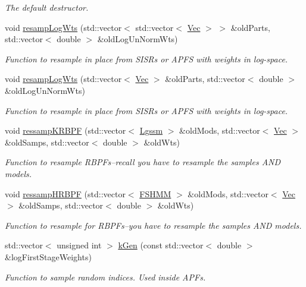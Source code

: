 \begin{DoxyCompactItemize}
\begin{DoxyCompactList}\small\item\em The default destructor. \end{DoxyCompactList}\item 
void \hyperlink{classMultinomResamp_a0ea6269180faf0b0613072d9bc8a7b53}{resamp\+Log\+Wts} (std\+::vector$<$ std\+::vector$<$ \hyperlink{apf__filter_8h_a4c7df05c6f5e8a0d15ae14bcdbc07152}{Vec} $>$ $>$ \&old\+Parts, std\+::vector$<$ double $>$ \&old\+Log\+Un\+Norm\+Wts)
\begin{DoxyCompactList}\small\item\em Function to resample in place from S\+I\+S\+Rs or A\+P\+FS with weights in log-\/space. \end{DoxyCompactList}\item 
void \hyperlink{classMultinomResamp_afd01aa78b0e2c0112c6af41164bc1e2b}{resamp\+Log\+Wts} (std\+::vector$<$ \hyperlink{apf__filter_8h_a4c7df05c6f5e8a0d15ae14bcdbc07152}{Vec} $>$ \&old\+Parts, std\+::vector$<$ double $>$ \&old\+Log\+Un\+Norm\+Wts)
\begin{DoxyCompactList}\small\item\em Function to resample in place from S\+I\+S\+Rs or A\+P\+FS with weights in log-\/space. \end{DoxyCompactList}\item 
void \hyperlink{classMultinomResamp_ad39c4f5d5460e3e4a2c56370c8dab39f}{ressamp\+K\+R\+B\+PF} (std\+::vector$<$ \hyperlink{classLgssm}{Lgssm} $>$ \&old\+Mods, std\+::vector$<$ \hyperlink{apf__filter_8h_a4c7df05c6f5e8a0d15ae14bcdbc07152}{Vec} $>$ \&old\+Samps, std\+::vector$<$ double $>$ \&old\+Wts)
\begin{DoxyCompactList}\small\item\em Function to resample R\+B\+P\+Fs--recall you have to resample the samples A\+ND models. \end{DoxyCompactList}\item 
void \hyperlink{classMultinomResamp_aaddcbec4eb62954d8d7aa96c45ffd7d0}{ressamp\+H\+R\+B\+PF} (std\+::vector$<$ \hyperlink{classFSHMM}{F\+S\+H\+MM} $>$ \&old\+Mods, std\+::vector$<$ \hyperlink{apf__filter_8h_a4c7df05c6f5e8a0d15ae14bcdbc07152}{Vec} $>$ \&old\+Samps, std\+::vector$<$ double $>$ \&old\+Wts)
\begin{DoxyCompactList}\small\item\em Function to resample for R\+B\+P\+Fs--you have to resample the samples A\+ND models. \end{DoxyCompactList}\item 
std\+::vector$<$ unsigned int $>$ \hyperlink{classMultinomResamp_a74c84e7b6b88eb1f6e1a0c77d734d7cf}{k\+Gen} (const std\+::vector$<$ double $>$ \&log\+First\+Stage\+Weights)
\begin{DoxyCompactList}\small\item\em Function to sample random indices. Used inside A\+P\+Fs. \end{DoxyCompactList}\end{DoxyCompactItemize}


